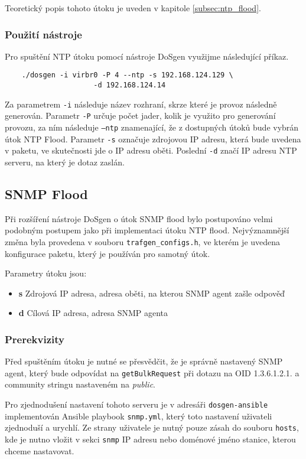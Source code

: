 Teoretický popis tohoto útoku je uveden v kapitole \ref{subsec:ntp_flood}.

\subsubsection{Použití nástroje}
Pro spuštění NTP útoku pomocí nástroje DoSgen využijme následující příkaz.
\begin{lstlisting}
	./dosgen -i virbr0 -P 4 --ntp -s 192.168.124.129 \
                     -d 192.168.124.14
\end{lstlisting}

Za parametrem \texttt{-i} následuje název rozhraní, skrze které je provoz následně generován. Parametr \texttt{-P} určuje počet jader, kolik je využito pro generování provozu, za ním následuje \texttt{--ntp} znamenající, že z dostupných útoků bude vybrán útok NTP Flood. Parametr \texttt{-s} označuje zdrojovou IP adresu, která bude uvedena v paketu, ve skutečnosti jde o IP adresu oběti. Poslední \texttt{-d} značí IP adresu NTP serveru, na který je dotaz zaslán.

\subsection{SNMP Flood}
Při rozšíření nástroje DoSgen o útok SNMP flood bylo postupováno velmi podobným postupem jako při implementaci útoku NTP flood. Nejvýznamnější změna byla provedena v souboru \texttt{trafgen\_configs.h}, ve kterém je uvedena konfigurace paketu, který je používán pro samotný útok.

\noindent Parametry útoku jsou:
\begin{itemize}
	\item \textbf{s} Zdrojová IP adresa, adresa oběti, na kterou SNMP agent zašle odpověď
	\item \textbf{d} Cílová IP adresa, adresa SNMP agenta
\end{itemize}

\subsubsection{Prerekvizity}
Před spuštěním útoku je nutné se přesvědčit, že je správně nastavený SNMP agent, který bude odpovídat na \texttt{getBulkRequest} při dotazu na OID 1.3.6.1.2.1. a community stringu nastaveném na \textit{public}.

Pro zjednodušení nastavení tohoto serveru je v adresáři \texttt{dosgen-ansible} implementován Ansible playbook \texttt{snmp.yml}, který toto nastavení uživateli zjednoduší a urychlí. Ze strany uživatele je nutný pouze zásah do souboru \texttt{hosts}, kde je nutno vložit v sekci \texttt{snmp} IP adresu nebo doménové jméno stanice, kterou chceme nastavovat.

